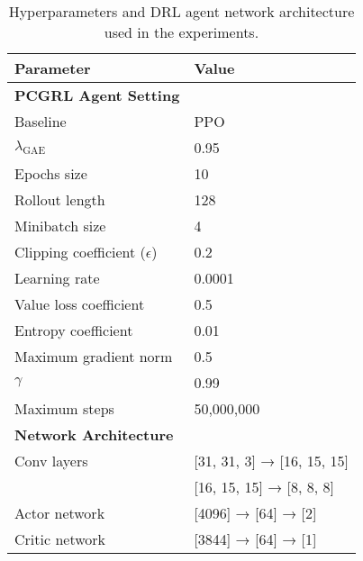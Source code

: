 

\begin{table}[!h]
\centering
\caption{Hyperparameters and DRL agent network architecture used in the experiments.}
\label{tab:Hyperparameter}
\begin{tabular}{m{3.5cm}m{3.5cm}}
\toprule
\textbf{Parameter}      &   \textbf{Value}  \\
\midrule
\textbf{PCGRL Agent Setting}          &                   \\
Baseline              &   PPO            \\
$\lambda_{\text{GAE}}$              &   0.95            \\
Epochs size                    &   10              \\
Rollout length                      &   128             \\
Minibatch size                      &   4               \\
Clipping coefficient ($\epsilon$)   &   0.2             \\
Learning rate                       &   0.0001          \\
Value loss coefficient              &   0.5             \\
Entropy coefficient                 &   0.01            \\
Maximum gradient norm               &   0.5             \\
$\gamma$                            &   0.99            \\
Maximum steps                       &   50,000,000      \\
\midrule
\textbf{Network Architecture}       &                   \\
Conv layers &   [31, 31, 3] → [16, 15, 15] \\
            &   [16, 15, 15] → [8, 8, 8]   \\
Actor network &   [4096] → [64] → [2]         \\
Critic network &   [3844] → [64] → [1]         \\
\bottomrule
\end{tabular}
\end{table}
